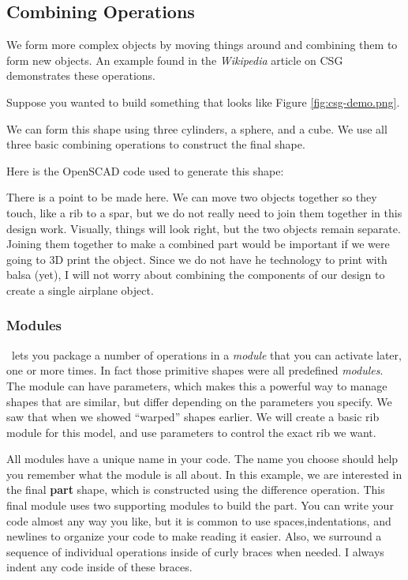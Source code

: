 \subsection{Combining Operations}

We form more complex objects by moving things around and combining them to form
new objects. An example found in the {\it Wikipedia} article on CSG~\cite{csgwiki}
demonstrates these operations.

Suppose you wanted to build something that looks like Figure \ref{fig:csg-demo.png}.


We can form this shape using three cylinders, a sphere, and a cube. We use all
three basic combining operations to construct the final shape.

Here is the OpenSCAD code used to generate this shape:


There is a point to be made here. We can move two objects together so they
touch, like a rib to a spar, but we do not really need to join them together in
this design work. Visually, things will look right, but the two objects remain
separate. Joining them together to make a combined part would be important if we
were going to 3D print the object. Since we do not have he technology to print
with balsa (yet), I will not worry about combining the components of our design
to create a single airplane object.

\subsubsection*{Modules}

\osc\ lets you package a number of operations in a {\it module} that you can
activate later, one or more times. In fact those primitive shapes were all
predefined {\it modules}. The module can have parameters, which makes this a
powerful way to manage shapes that are similar, but differ depending on the
parameters you specify.  We saw that when we showed ``warped'' shapes earlier.
We will create a basic rib module for this model, and use parameters to control
the exact rib we want.

All modules have a unique name in your code.  The name you choose should help
you remember what the module is all about. In this example, we are interested
in the final {\bf part} shape, which is constructed using the difference
operation. This final module uses two supporting modules to build the part. You
can write your code almost any way you like, but it is common to use
spaces,indentations, and newlines to organize your code to make reading it
easier.  Also, we surround a sequence of individual operations inside of curly
braces when needed. I always indent any code inside of these braces.

